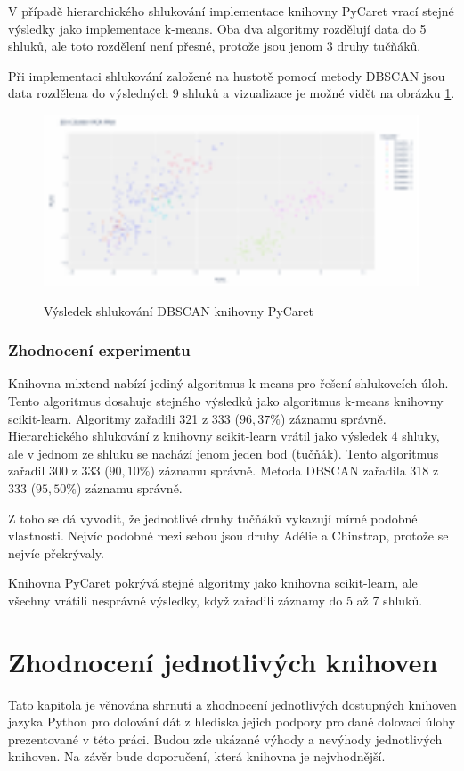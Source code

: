 V případě hierarchického shlukování implementace knihovny PyCaret vrací stejné výsledky
jako implementace k-means. Oba dva algoritmy rozdělují data do 5 shluků, ale toto rozdělení není přesné, protože jsou jenom 3 druhy tučňáků. 

Při implementaci shlukování založené na hustotě pomocí metody DBSCAN jsou data rozdělena do výsledných 9 shluků a vizualizace je možné vidět na obrázku \ref{dbscanpycaretclusters}.

\begin{figure}[h]\centering
  \centering
  \includegraphics[width=\linewidth,height=2.0in]{obrazky/dbscanpycaret.pdf}\\[1pt]
  \caption{Výsledek shlukování DBSCAN knihovny PyCaret}
  \label{dbscanpycaretclusters}
\end{figure}

\subsection*{Zhodnocení experimentu}
Knihovna mlxtend nabízí jediný algoritmus k-means pro řešení shlukovcích úloh. Tento algoritmus dosahuje stejného výsledků jako algoritmus k-means knihovny scikit-learn. Algoritmy zařadili 321 z 333 ($ 96,37 \%$) záznamu správně. Hierarchického shlukování z knihovny scikit-learn vrátil jako výsledek 4 shluky, ale v jednom ze shluku se nachází jenom jeden bod (tučňák). Tento algoritmus zařadil 300 z 333 ($ 90,10 \%$) záznamu správně. Metoda DBSCAN zařadila 318 z 333 ($ 95,50 \%$) záznamu správně.

Z toho se dá vyvodit, že jednotlivé druhy tučňáků vykazují mírné podobné vlastnosti. Nejvíc podobné mezi sebou jsou druhy Adélie a Chinstrap, protože se nejvíc překrývaly. 

Knihovna PyCaret pokrývá stejné algoritmy jako knihovna scikit-learn, ale všechny vrátili nesprávné výsledky, když zařadili záznamy do 5 až 7 shluků.

\chapter{Zhodnocení jednotlivých knihoven}
\label{zhodnoceni}
Tato kapitola je věnována shrnutí a zhodnocení jednotlivých dostupných knihoven jazyka Python pro dolování dát z hlediska jejich podpory pro dané dolovací úlohy prezentované v této práci. Budou zde ukázané výhody a nevýhody jednotlivých knihoven. Na závěr bude doporučení, která knihovna je nejvhodnější.

